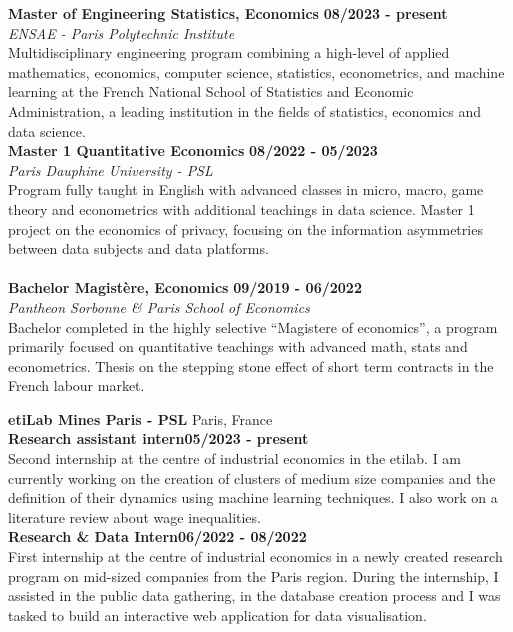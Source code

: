 \documentclass[11pt]{report}
\begin{document}
	
\noindent\textbf{Master of Engineering \textbar\space Statistics,  Economics}
\hfill
\textbf{08/2023 - present} \\
\emph{ENSAE - Paris Polytechnic Institute}\\
Multidisciplinary engineering program combining a high-level of applied mathematics, economics, computer science, statistics, econometrics, and machine learning at the French National School of Statistics and Economic Administration, a leading institution in the fields of statistics, economics and data science.  \\

\noindent\textbf{Master 1 \textbar\space Quantitative Economics}
\hfill
\textbf{08/2022 - 05/2023} \\
\emph{Paris Dauphine University - PSL}\\
Program fully taught in English with advanced classes in micro, macro, game theory and econometrics  with additional teachings in data science. Master 1 project on the economics of privacy, focusing on the information asymmetries between data subjects and data platforms. \\
\\
\noindent\textbf{Bachelor \textbar\space Magistère, Economics}
\hfill
\textbf{09/2019 - 06/2022} \\
\emph{Pantheon Sorbonne \& Paris School of Economics}\\
Bachelor completed in the highly selective “Magistere of economics”, a program primarily focused on quantitative teachings with advanced math, stats and econometrics. Thesis on the stepping stone effect of short term contracts in the French labour market. 


	\begin{flushleft}
	 \hrulefill
	\end{flushleft}


\noindent\textbf{etiLab Mines Paris - PSL} \hfill Paris, France\\[0.1cm]
\textbf{Research assistant intern}\hfill \textbf{05/2023 - present} \\
Second internship at the centre of industrial economics in the etilab. I am currently working on the creation of clusters of medium size companies and the definition of their dynamics using machine learning techniques. I also work on a literature review about wage inequalities. \\[0.1cm]
\textbf{Research \& Data Intern}\hfill \textbf{06/2022 - 08/2022} \\
First internship at the centre of industrial economics in a newly created research program on mid-sized companies from the Paris region. During the internship, I assisted in the public data gathering, in the database
creation process and I was tasked to build an interactive web application for data visualisation.\\
\end{document}
